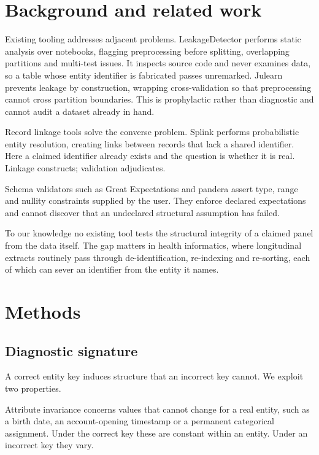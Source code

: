 \documentclass[preprint,12pt]{elsarticle}
\begin{document}
\section{Background and related work}

Existing tooling addresses adjacent problems. LeakageDetector \cite{drosos2025}
performs static analysis over notebooks, flagging preprocessing before
splitting, overlapping partitions and multi-test issues. It inspects source code
and never examines data, so a table whose entity identifier is fabricated passes
unremarked. Julearn \cite{hamdan2024} prevents leakage by construction, wrapping
cross-validation so that preprocessing cannot cross partition boundaries. This
is prophylactic rather than diagnostic and cannot audit a dataset already in
hand.

Record linkage tools solve the converse problem. Splink \cite{linacre2022}
performs probabilistic entity resolution, creating links between records that
lack a shared identifier. Here a claimed identifier already exists and the
question is whether it is real. Linkage constructs; validation adjudicates.

Schema validators such as Great Expectations and pandera assert type, range and
nullity constraints supplied by the user. They enforce declared expectations and
cannot discover that an undeclared structural assumption has failed.

To our knowledge no existing tool tests the structural integrity of a claimed
panel from the data itself. The gap matters in health informatics, where
longitudinal extracts routinely pass through de-identification, re-indexing and
re-sorting, each of which can sever an identifier from the entity it names.

\section{Methods}

\subsection{Diagnostic signature}

A correct entity key induces structure that an incorrect key cannot. We exploit
two properties.

Attribute invariance concerns values that cannot change for a real entity, such
as a birth date, an account-opening timestamp or a permanent categorical
assignment. Under the correct key these are constant within an entity. Under an
incorrect key they vary.
\end{document}
